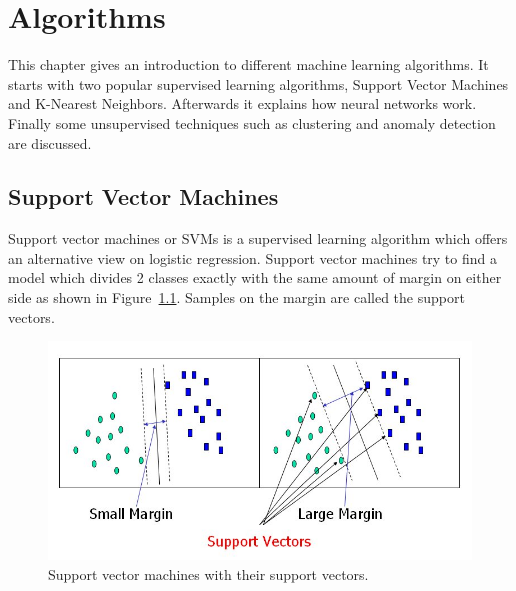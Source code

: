 \chapter{Algorithms}
\label{algorithms}
This chapter gives an introduction to different machine learning algorithms. It starts with two popular supervised learning algorithms, Support Vector Machines and K-Nearest Neighbors. Afterwards it explains how neural networks work. Finally some unsupervised techniques such as clustering and anomaly detection are discussed. 

\section{Support Vector Machines}
\label{svmalg}
Support vector machines or SVMs is a supervised learning algorithm which offers an alternative view on logistic regression. Support vector machines try to find a model which divides 2 classes exactly with the same amount of margin on either side as shown in Figure~\ref{fig:svm}. Samples on the margin are called the support vectors.
\begin{figure}[H]
\centering
\includegraphics[width=\textwidth]{Figures/svm}
\decoRule
\caption[Support Vector Machines]{Support vector machines with their support vectors. \cite{svm}}
\label{fig:svm}
\end{figure}

